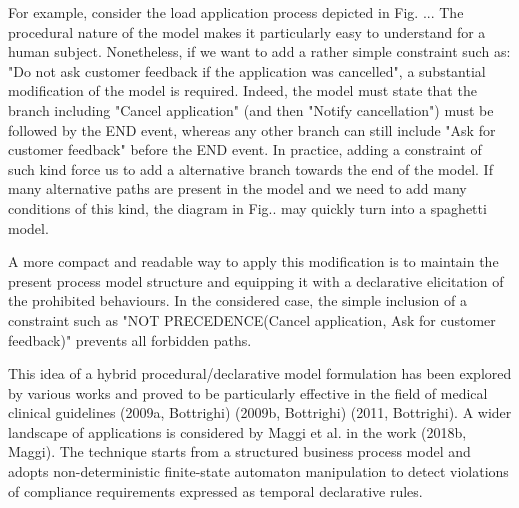 For example, consider the load application process depicted in Fig. ... The procedural nature of the model makes it particularly easy to understand for a human subject. Nonetheless, if we want to add a rather simple constraint such as: "Do not ask customer feedback if the application was cancelled", a substantial modification of the model is required.
Indeed, the model must state that the branch including "Cancel application" (and then "Notify cancellation") must be followed by the END event, whereas any other branch can still include "Ask for customer feedback" before the END event.
In practice, adding a constraint of such kind force us to add a alternative branch towards the end of the model.
If many alternative paths are present in the model and we need to add many conditions of this kind, the diagram in Fig.. may quickly turn into a spaghetti model.


A more compact and readable way to apply this modification is to maintain the present process model structure and equipping it with a declarative elicitation of the prohibited behaviours. In the considered case, the simple inclusion of a constraint such as "NOT PRECEDENCE(Cancel application, Ask for customer feedback)" prevents all forbidden paths. 

This idea of a hybrid procedural/declarative model formulation has been explored by various works and proved to be particularly effective in the field of medical clinical guidelines (2009a, Bottrighi) (2009b, Bottrighi) (2011, Bottrighi). A wider landscape of applications is considered by Maggi et al. in the work (2018b, Maggi). The technique starts from a structured business process model and adopts non-deterministic finite-state automaton manipulation to detect violations of compliance requirements expressed as temporal declarative rules.
